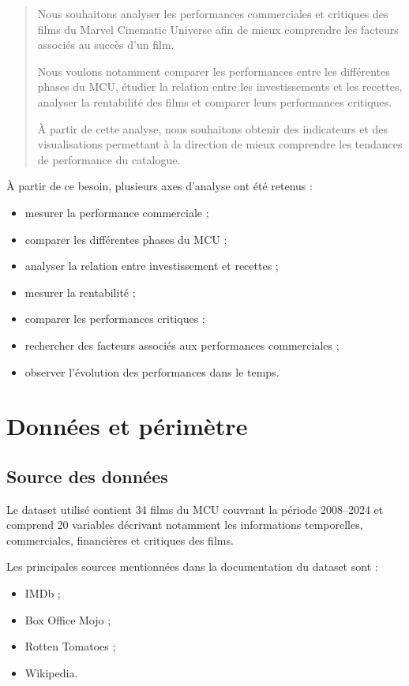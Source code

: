 \documentclass[a4paper,11pt]{article}
\begin{document}
\begin{quote}
\og Nous souhaitons analyser les performances commerciales et critiques des
films du Marvel Cinematic Universe afin de mieux comprendre les facteurs
associés au succès d'un film.

Nous voulons notamment comparer les performances entre les différentes
phases du MCU, étudier la relation entre les investissements et les recettes,
analyser la rentabilité des films et comparer leurs performances critiques.

À partir de cette analyse, nous souhaitons obtenir des indicateurs et des
visualisations permettant à la direction de mieux comprendre les tendances
de performance du catalogue. \fg
\end{quote}

À partir de ce besoin, plusieurs axes d'analyse ont été retenus :
\begin{itemize}
  \item mesurer la performance commerciale ;
  \item comparer les différentes phases du MCU ;
  \item analyser la relation entre investissement et recettes ;
  \item mesurer la rentabilité ;
  \item comparer les performances critiques ;
  \item rechercher des facteurs associés aux performances commerciales ;
  \item observer l'évolution des performances dans le temps.
\end{itemize}

\section{Données et périmètre}

\subsection{Source des données}

Le dataset utilisé contient 34 films du MCU couvrant la période 2008--2024
et comprend 20 variables décrivant notamment les informations temporelles,
commerciales, financières et critiques des films.

Les principales sources mentionnées dans la documentation du dataset sont :
\begin{itemize}
  \item IMDb ;
  \item Box Office Mojo ;
  \item Rotten Tomatoes ;
  \item Wikipedia.
\end{itemize}
\end{document}
